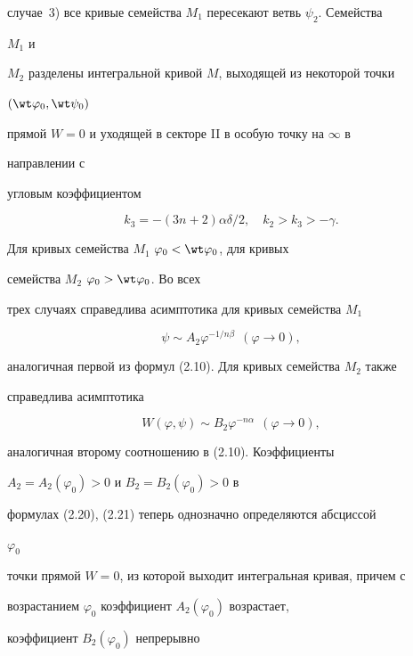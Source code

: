 случае~3) все кривые семейства $M_1$ пересекают ветвь $\psi_2$. Семейства 


$M_1$ и 


$M_2$ разделены интегральной кривой $M$, выходящей из некоторой точки 


$(\wt\varphi_0,\wt\psi_0)$ 


прямой $W=0$ и уходящей в секторе II в особую точку на $\infty$ в 


направлении с 


угловым коэффициентом 


\begin{equation} 


k_3=-(3n+2)\alpha\delta/2,\quad k_2>k_3>-\gamma.\tag{2.19} 


\end{equation} 


Для кривых семейства $M_1$\; $\varphi_0<\wt\varphi_0$, для кривых 


семейства $M_2$\; $\varphi_0>\wt\varphi_0$. Во всех 


трех случаях справедлива асимптотика для кривых семейства $M_1$ 


\begin{equation} 


\psi\sim A_2\varphi^{-1/n\beta}\ \ (\varphi\to0),\tag{2.20} 


\end{equation} 


аналогичная первой из формул (2.10). Для кривых семейства $M_2$ также 


справедлива асимптотика 


\begin{equation} 


W(\varphi,\psi)\sim B_2\varphi^{-n\alpha}\ \ (\varphi\to0),\tag{2.21} 


\end{equation} 


аналогичная второму соотношению в (2.10). Коэффициенты 


$A_2=A_2(\varphi_0)>0$ и $B_2=B_2(\varphi_0)>0$ в 


формулах (2.20), (2.21) теперь однозначно определяются абсциссой 


$\varphi_0$ 


точки прямой $W{=}0$, из которой выходит интегральная кривая, причем с 


возрастанием $\varphi_0$ коэффициент $A_2(\varphi_0)$ возрастает, 


коэффициент $B_2(\varphi_0)$ непрерывно 


